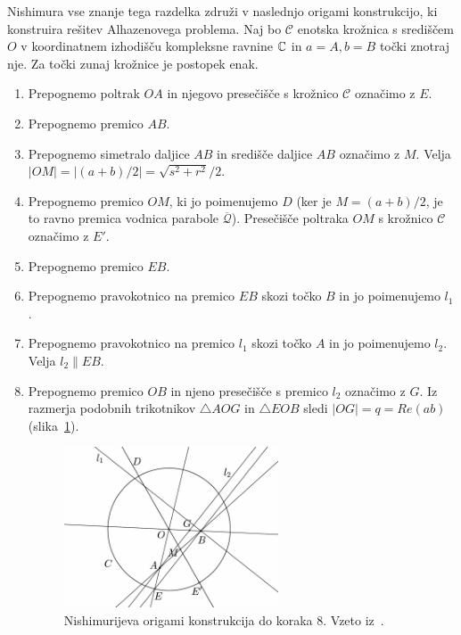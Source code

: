Nishimura vse znanje tega razdelka združi v naslednjo origami konstrukcijo, ki konstruira rešitev Alhazenovega problema. Naj bo $\mathcal{C}$ enotska krožnica s središčem $O$ v koordinatnem izhodišču kompleksne ravnine $\mathbb C$ in $a = A, b = B$ točki znotraj nje. Za točki zunaj krožnice je postopek enak.
\begin{enumerate}
    \item Prepognemo poltrak $OA$ in njegovo presečišče s krožnico $\mathcal{C}$ označimo z $E$.
    \item Prepognemo premico $AB$.
    \item Prepognemo simetralo daljice $AB$ in središče daljice $AB$ označimo z $M$. Velja $ |OM| = |(a+b)/2| = \sqrt{s^2+r^2}/2$.
    \item Prepognemo premico $OM$, ki jo poimenujemo $D$ (ker je $ M = (a+b)/2$, je to ravno premica vodnica parabole $\mathcal{\overline{Q}}$). Presečišče poltraka $OM$ s krožnico $\mathcal{C}$ označimo z $E'$.
    \item Prepognemo premico $EB$.
    \item Prepognemo pravokotnico na premico $EB$ skozi točko $B$ in jo poimenujemo $l_1$.
    \item Prepognemo pravokotnico na premico $l_1$ skozi točko $A$ in jo poimenujemo $l_2$. Velja $l_2 \parallel EB$.
    \item Prepognemo premico $OB$ in njeno presečišče s premico $l_2$ označimo z $G$. Iz razmerja podobnih trikotnikov $\triangle AOG$ in $\triangle EOB$ sledi $|OG| = q = Re(ab)$ (slika~\ref{fig:nishimura_origami}).
    \begin{figure}[h]
        \centering
        \includegraphics[width=0.6\textwidth]{images/alhazen/nishimura_origami.png}
        \caption[Nishimurijeva konstrukcija $1$]{Nishimurijeva origami konstrukcija do koraka $8$. Vzeto iz~\cite[str.\ 41]{nishimura2018}.}
        \label{fig:nishimura_origami}
    \end{figure}

\end{enumerate}
